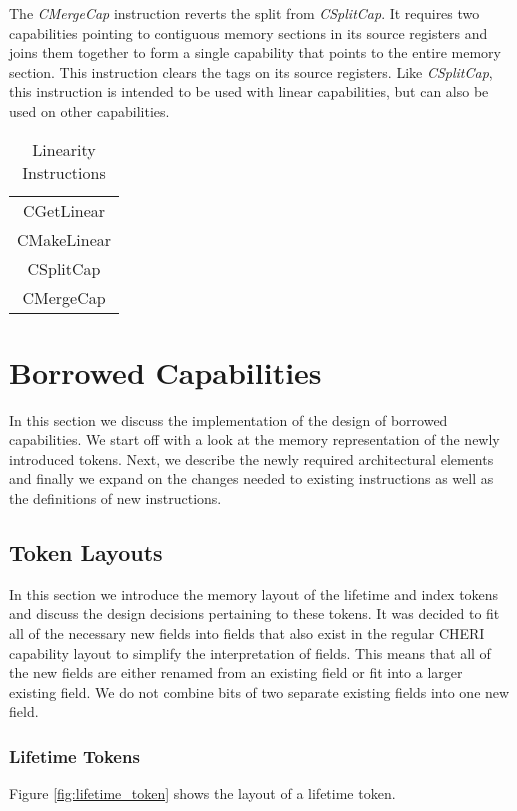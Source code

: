 The \textit{CMergeCap} instruction reverts the split from \textit{CSplitCap}. It requires two capabilities pointing to contiguous memory sections in its source registers and joins them together to form a single capability that points to the entire memory section. This instruction clears the tags on its source registers. Like \textit{CSplitCap}, this instruction is intended to be used with linear capabilities, but can also be used on other capabilities.

\begin{table}[h]
\centering
\begin{tabular}{| c |}
\hline
 CGetLinear \\
 CMakeLinear \\
 CSplitCap \\
 CMergeCap \\
\hline
\end{tabular}
\caption{Linearity Instructions}
\label{table:linearityinst}
\end{table}

\section{Borrowed Capabilities}
In this section we discuss the implementation of the design of borrowed capabilities. We start off with a look at the memory representation of the newly introduced tokens. Next, we describe the newly required architectural elements and finally we expand on the changes needed to existing instructions as well as the definitions of new instructions.
\subsection{Token Layouts}
In this section we introduce the memory layout of the lifetime and index tokens and discuss the design decisions pertaining to these tokens. It was decided to fit all of the necessary new fields into fields that also exist in the regular CHERI capability layout to simplify the interpretation of fields. This means that all of the new fields are either renamed from an existing field or fit into a larger existing field. We do not combine bits of two separate existing fields into one new field.

\subsubsection{Lifetime Tokens}
Figure \ref{fig:lifetime_token} shows the layout of a lifetime token.

